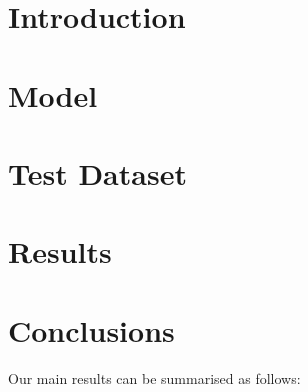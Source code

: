 \documentclass[useAMS,usenatbib]{mn2e}
\begin{document}

\section{Introduction}
\label{sec:intro}



\section{Model}
\label{sec:model}



\section{Test Dataset}
\label{sec:data}


\section{Results}
\label{sec:results}





\section{Conclusions}
\label{sec:concl}

Our main results can be summarised as follows:
\end{document}
